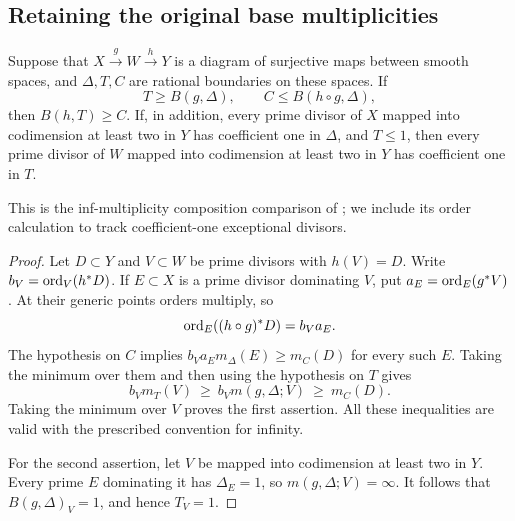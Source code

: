 \subsection{Retaining the original base multiplicities}

\begin{lemma}
\label{application:composition}
Suppose that \(X\xrightarrow{g}W\xrightarrow{h}Y\) is a diagram of
surjective maps between smooth spaces, and \(\Delta,T,C\) are rational
boundaries on these spaces.  If
\[
 T\geq B(g,\Delta),\qquad C\leq B(h\circ g,\Delta),
\]
then \(B(h,T)\geq C\).  If, in addition, every prime divisor of \(X\)
mapped into codimension at least two in \(Y\) has coefficient one in
\(\Delta\), and \(T\leq1\), then every prime divisor of \(W\) mapped
into codimension at least two in \(Y\) has coefficient one in \(T\).
\end{lemma}

This is the inf-multiplicity composition comparison of
\cite[Proposition~3.13(1)]{CampanaOrbifolds}; we include its order
calculation to track coefficient-one exceptional divisors.

\begin{proof}
Let \(D\subset Y\) and \(V\subset W\) be prime divisors with
\(h(V)=D\).  Write \(b_V=\operatorname{ord}_V(h^*D)\).  If \(E\subset X\) is a
prime divisor dominating \(V\), put \(a_E=\operatorname{ord}_E(g^*V)\).  At their
generic points orders multiply, so
\[
 \operatorname{ord}_E((h\circ g)^*D)=b_Va_E.
\]
The hypothesis on \(C\) implies
\(b_Va_E m_\Delta(E)\geq m_C(D)\) for every such \(E\).  Taking the
minimum over them and then using the hypothesis on \(T\) gives
\[
 b_Vm_T(V)\ \geq\ b_Vm(g,\Delta;V)\ \geq\ m_C(D).
\]
Taking the minimum over \(V\) proves the first assertion.  All these
inequalities are valid with the prescribed convention for infinity.

For the second assertion, let \(V\) be mapped into codimension at least
two in \(Y\).  Every prime \(E\) dominating it has
\(\Delta_E=1\), so \(m(g,\Delta;V)=\infty\).  It follows that
\(B(g,\Delta)_V=1\), and hence \(T_V=1\).
\end{proof}
